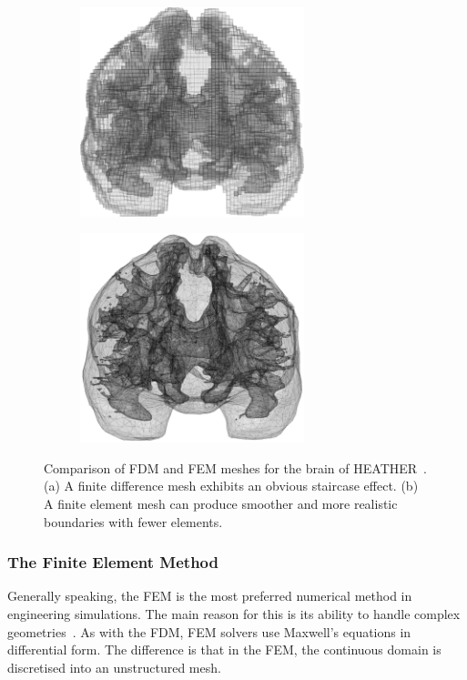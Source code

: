 \begin{figure}
    \centering

    \begin{subfigure}[t]{0.5\textwidth}
        \centering
        \includegraphics[width=6.5cm]{Background/mesh_grid}
        \caption{ }
        \label{fig:mesh_grid}
    \end{subfigure}%
	\begin{subfigure}[t]{0.5\textwidth}
        \centering
        \includegraphics[width=6.5cm]{Background/mesh_free}
        \caption{ }
        \label{fig:mesh_free}
    \end{subfigure}
    
	\caption[Comparison of FDM and FEM meshes]{Comparison of FDM and FEM meshes for
	the brain of HEATHER~\cite{tran2015}. (a) A finite difference mesh exhibits an
	obvious staircase effect. (b) A finite element mesh can produce smoother and
	more realistic boundaries with fewer elements.}
	\label{fig:mesh_comparison}
\end{figure}

\subsubsection{The Finite Element Method}

Generally speaking, the FEM is the most preferred numerical method in
engineering simulations. The main reason for this is its ability to handle
complex geometries~\cite{bondeson2005}. As with the FDM, FEM solvers use
Maxwell's equations in differential form. The difference is that in the FEM, the
continuous domain is discretised into an unstructured mesh.

